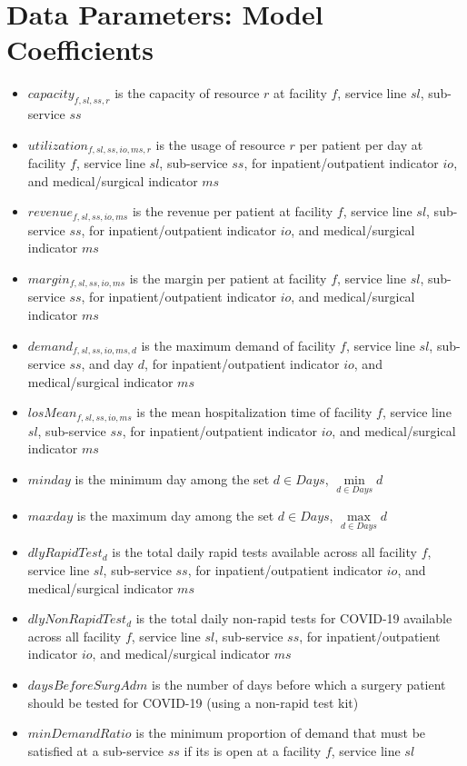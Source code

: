 \documentclass[10pt, letterpaper]{article}
\begin{document}
\section*{Data Parameters: Model Coefficients}
\begin{itemize}
\item[ ] $capacity_{f,sl,ss,r}$  is the capacity of resource $r$ at facility $f$, service line $sl$, sub-service $ss$
\item[ ] $utilization_{f,sl,ss,io,ms,r}$ is the usage of resource $r$ per patient per day at facility $f$, service line $sl$, sub-service $ss$, for inpatient/outpatient indicator $io$, and medical/surgical indicator $ms$
\item[ ] $revenue_{f,sl,ss,io,ms}$  is the revenue per patient at facility $f$, service line $sl$, sub-service $ss$, for inpatient/outpatient indicator $io$, and medical/surgical indicator $ms$
\item[ ] $margin_{f,sl,ss,io,ms}$  is the margin per patient at facility $f$, service line $sl$, sub-service $ss$, for inpatient/outpatient indicator $io$, and medical/surgical indicator $ms$
\item[ ] $demand_{f,sl,ss,io,ms,d}$ is the maximum demand of facility $f$, service line $sl$, sub-service $ss$, and day $d$, for inpatient/outpatient indicator $io$, and medical/surgical indicator $ms$
\item[ ] $losMean_{f,sl,ss,io,ms}$  is the mean hospitalization time of facility $f$, service line $sl$, sub-service $ss$, for inpatient/outpatient indicator $io$, and medical/surgical indicator $ms$
\item[ ] $minday$ is the minimum day among the set $ d \in Days$, ${\min\limits_{d \in Days} d}$
\item[ ] $maxday$ is the maximum day among the set $ d \in Days$, ${\max\limits_{d \in Days} d}$
\item[ ] $dlyRapidTest_{d}$ is the total daily rapid tests available across all facility $f$, service line $sl$, sub-service $ss$, for inpatient/outpatient indicator $io$, and medical/surgical indicator $ms$ \item[ ] $dlyNonRapidTest_{d}$ is the total daily non-rapid tests for COVID-19 available across all facility $f$, service line $sl$, sub-service $ss$, for inpatient/outpatient indicator $io$, and medical/surgical indicator $ms$ 

\pagebreak

\item[ ] $daysBeforeSurgAdm$ is the number of days before which a surgery patient should be tested for COVID-19 (using a non-rapid test kit) 
\item[ ] $minDemandRatio$ is the minimum proportion of demand that must be satisfied at a sub-service $ss$ if its is open at a facility $f$, service line $sl$ \end{itemize}
\end{document}
